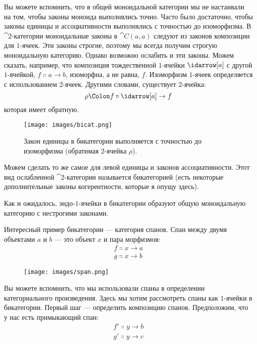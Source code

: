 Вы можете вспомнить, что в общей моноидальной категории мы не настаивали
на том, чтобы законы моноида выполнялись точно. Часто было достаточно, чтобы
законы единицы и ассоциативности выполнялись с точностью до
изоморфизма. В $\cat{2}$-категории моноидальные законы в $\cat{C}(a, a)$ следуют
из законов композиции для $1$-ячеек. Эти законы строгие, поэтому мы всегда
получим строгую моноидальную категорию. Однако возможно ослабить
и эти законы. Можем сказать, например, что композиция
тождественной $1$-ячейки $\idarrow[a]$ с другой $1$-ячейкой,
$f \Colon a \to b$, изоморфна, а не равна,
$f$. Изоморфизм $1$-ячеек определяется с использованием $2$-ячеек. Другими
словами, существует $2$-ячейка:
\[\rho \Colon f \circ \idarrow[a] \to f\]
которая имеет обратную.

\begin{figure}[H]
  \centering
  \texttt{[image: images/bicat.png]}
  \caption{Закон единицы в бикатегории выполняется с точностью до изоморфизма (обратимая
    $2$-ячейка $\rho$).}
\end{figure}

\noindent
Можем сделать то же самое для левой единицы и законов ассоциативности. Этот
вид ослабленной $\cat{2}$-категории называется бикатегорией (есть некоторые
дополнительные законы когерентности, которые я опущу здесь).

Как и ожидалось, эндо-$1$-ячейки в бикатегории образуют общую моноидальную
категорию с нестрогими законами.

Интересный пример бикатегории — категория спанов. Спан
между двумя объектами $a$ и $b$ — это объект $x$
и пара морфизмов:
\begin{gather*}
  f \Colon x \to a \\
  g \Colon x \to b
\end{gather*}

\begin{figure}[H]
  \centering
  \texttt{[image: images/span.png]}
\end{figure}

\noindent
Вы можете вспомнить, что мы использовали спаны в определении категориального
произведения. Здесь мы хотим рассмотреть спаны как $1$-ячейки в бикатегории.
Первый шаг — определить композицию спанов. Предположим, что у нас есть
примыкающий спан:
\begin{gather*}
  f' \Colon y \to b \\
  g' \Colon y \to c
\end{gather*}

